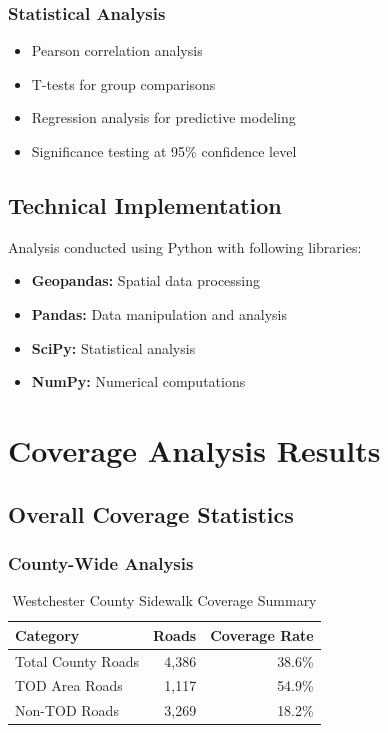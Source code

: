 \documentclass[11pt,letterpaper]{report}
\begin{document}
\subsection{Statistical Analysis}
\begin{itemize}
    \item Pearson correlation analysis
    \item T-tests for group comparisons
    \item Regression analysis for predictive modeling
    \item Significance testing at 95\% confidence level
\end{itemize}

\section{Technical Implementation}

Analysis conducted using Python with following libraries:
\begin{itemize}
    \item \textbf{Geopandas:} Spatial data processing
    \item \textbf{Pandas:} Data manipulation and analysis
    \item \textbf{SciPy:} Statistical analysis
    \item \textbf{NumPy:} Numerical computations
\end{itemize}

\chapter{Coverage Analysis Results}

\section{Overall Coverage Statistics}

\subsection{County-Wide Analysis}
\begin{table}[h]
\centering
\caption{Westchester County Sidewalk Coverage Summary}
\begin{tabular}{lrr}
\toprule
\textbf{Category} & \textbf{Roads} & \textbf{Coverage Rate} \\
\midrule
Total County Roads & 4,386 & 38.6\% \\
TOD Area Roads & 1,117 & 54.9\% \\
Non-TOD Roads & 3,269 & 18.2\% \\
\bottomrule
\end{tabular}
\end{table}
\end{document}
